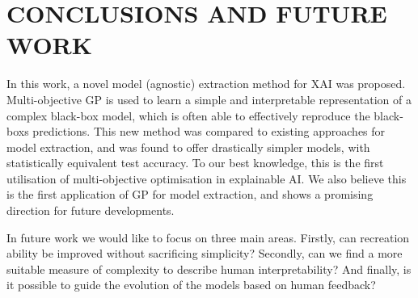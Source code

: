 \section{CONCLUSIONS AND FUTURE WORK}
In this work, a novel model (agnostic) extraction method for XAI was proposed. Multi-objective GP is used to learn a simple and interpretable representation of a complex black-box model, which is often able to effectively reproduce the black-box\textquotesingle s predictions. This new method was compared to existing approaches for model extraction, and was found to offer drastically simpler models, with statistically equivalent test accuracy. To our best knowledge, this is the first utilisation of multi-objective optimisation in explainable AI. We also believe this is the first application of GP for model extraction, and shows a promising direction for future developments.

In future work we would like to focus on three main areas. Firstly, can recreation ability be improved without sacrificing simplicity? Secondly, can we find a more suitable measure of complexity to describe human interpretability?  And finally, is it possible to guide the evolution of the models based on human feedback?



